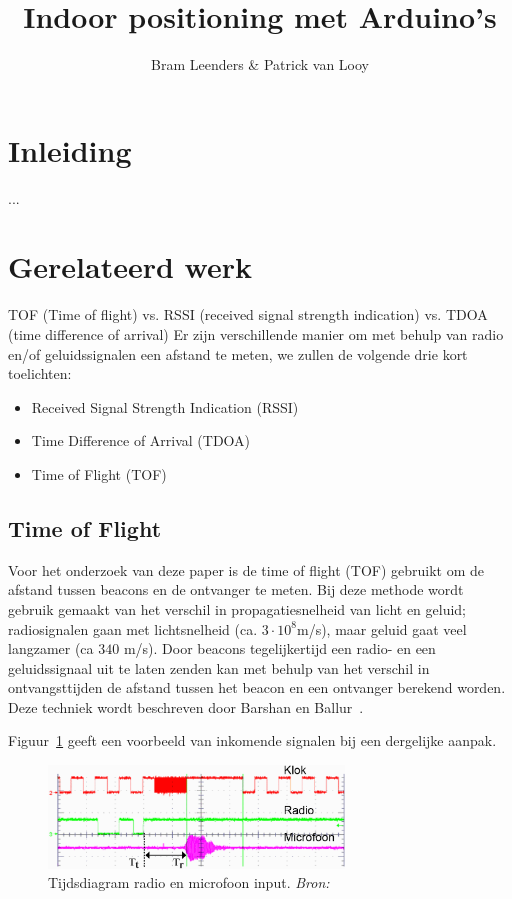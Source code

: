 \documentclass[a4paper,10pt]{article}
\title{Indoor positioning met Arduino's}
\author{Bram Leenders \& Patrick van Looy}
\begin{document}
\maketitle

\section{Inleiding}
...

\section{Gerelateerd werk}\label{sec:gerelateerd}
TOF (Time of flight) vs. RSSI (received signal strength indication) vs. TDOA (time difference of arrival)
Er zijn verschillende manier om met behulp van radio en/of geluidssignalen een afstand te meten, we zullen de volgende drie kort toelichten:
\begin{itemize}
    \item Received Signal Strength Indication (RSSI)
    \item Time Difference of Arrival (TDOA)
    \item Time of Flight (TOF)
\end{itemize}

\subsection{Time of Flight}
Voor het onderzoek van deze paper is de time of flight (TOF) gebruikt om de afstand tussen beacons en de ontvanger te meten. Bij deze methode wordt gebruik gemaakt van het verschil in propagatiesnelheid van licht en geluid; radiosignalen gaan met lichtsnelheid (ca. $3\cdot 10^{8}$m/s), maar geluid gaat veel langzamer (ca $340$ m/s). Door beacons tegelijkertijd een radio- en een geluidssignaal uit te laten zenden kan met behulp van het verschil in ontvangsttijden de afstand tussen het beacon en een ontvanger berekend worden. Deze techniek wordt beschreven door Barshan en Ballur~\cite{barshan2000fast}.

Figuur~\ref{fig:tijdsdiagram} geeft een voorbeeld van inkomende signalen bij een dergelijke aanpak.
\begin{figure}[ht!]
    \centering
    \includegraphics[width=0.7\textwidth]{tijdsdiagram.png}
    \caption{Tijdsdiagram radio en microfoon input. \textit{Bron: \cite{park2011beacon}}}
    \label{fig:tijdsdiagram}
\end{figure}
\end{document}
